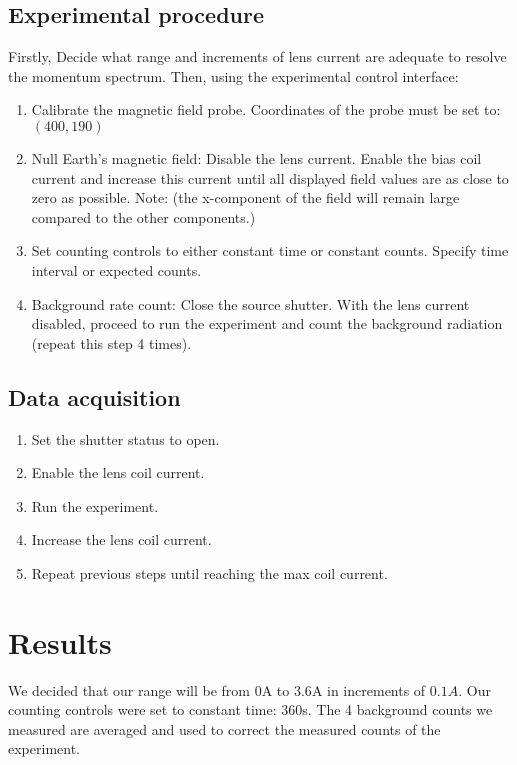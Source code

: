 \documentclass[10pt, a4paper]{article}
\begin{document}
\begin{multicols}{2}
\subsection{Experimental procedure}
Firstly, Decide what range and increments of lens current are adequate to resolve the momentum spectrum.
Then, using the experimental control interface:
\begin{enumerate}
\item Calibrate the magnetic field probe.
    Coordinates of the probe must be set to: $(400,190)$
\item Null Earth's magnetic field:
    Disable the lens current.
    Enable the bias coil current and increase this current until all displayed field values are as close to zero as possible. 
    Note: (the x-component of the field will remain large compared to the other components.)
\item Set counting controls to either constant time or constant counts.
    Specify time interval or expected counts.
\item Background rate count:
    Close the source shutter.
    With the lens current disabled, proceed to run the experiment and count the background radiation (repeat this step 4 times).
\end{enumerate}
\subsection{Data acquisition}
\begin{enumerate}
\item Set the shutter status to open.
\item Enable the lens coil current.
\item Run the experiment.
\item Increase the lens coil current.
\item Repeat previous steps until reaching the max coil current.
\end{enumerate}
\section{Results}




We decided that our range will be from $0$A to $3.6$A in increments of $0.1A$.  Our counting controls were set to constant time: $360$s.
The 4 background counts we measured are averaged and used to correct the measured counts of the experiment.


\end{multicols}
\end{document}
